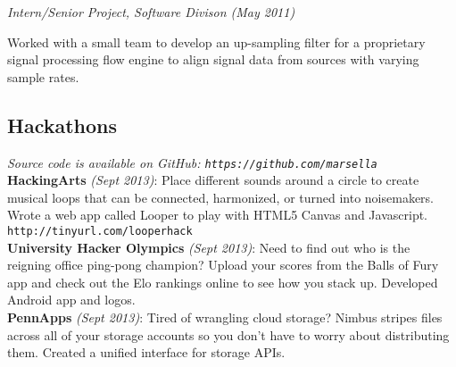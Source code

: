 \documentclass{article}
\newcommand{\position}[2]{
  \textit{#1 (#2)}
}
\newenvironment{achievements}{
  \begin{compactitem} }{
  \end{compactitem}
}
\newcommand{\skill}[2]{
  \textbf{#1}: #2
  \smallskip
}
\newcommand{\hack}[3]{
  \textbf{#1} \textit{(#2)}: #3
  \smallskip
}
\begin{document}
    \position {Intern/Senior Project, Software Divison} {May 2011}
    \begin{achievements}
      \item Worked with a small team to develop an up-sampling filter for a
      proprietary signal processing flow engine to align signal data from
      sources with varying sample rates.
    \end{achievements}

\subsection*{Hackathons}
  \textit{Source code is available on GitHub:
  \texttt{https://github.com/marsella}} \\
  \hack{HackingArts} {Sept 2013} 
        {Place different sounds around a circle to create musical loops that
        can be connected, harmonized, or turned into noisemakers. Wrote a web
        app called Looper to play with HTML5 Canvas and
        Javascript. \texttt{http://tinyurl.com/looperhack}} \\
  \hack{University Hacker Olympics} {Sept 2013} 
        {Need to find out who is the reigning office ping-pong champion?
        Upload your scores from the Balls of Fury app and check out
        the Elo rankings online to see how you stack up. Developed Android app 
        and logos.} \\ 
  \hack{PennApps} {Sept 2013} 
        {Tired of wrangling cloud storage? Nimbus stripes files
        across all of your storage accounts so you don't have to worry about
        distributing them. Created a unified interface for storage APIs.}

\begin{comment}
\subsection*{Projects}
  \skill{Type Inference}
        {Implemented Hindley-Milner type inference for a teaching language in
        ML. Wrote a constraint solver to assign types to correct terms and
        reject ill-typed terms.} \\
  \skill{TapItOut}
        {Developed the front end of a native Android app that allows
        peer-to-peer money transfer using NFC technology. Built at the 2013
        University Hacker Olympics in San Francisco.} \\
  \skill{Virtual Machine}
        {Designed and wrote a 32-bit virtual machine in C. Implemented a set of
        basic operations and a macro assembler to create executable binary
        files. Wrote a calculator program in assembly.}
\end{comment}
\end{document}
